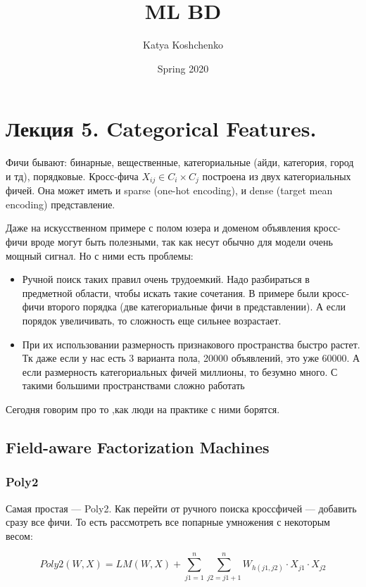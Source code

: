\documentclass[12pt]{article}
\title{ML BD}
\date{Spring 2020}
\begin{document}
\author{Katya Koshchenko}
\maketitle

\section{Лекция 5. Categorical Features.}  

Фичи бывают: бинарные, вещественные, категориальные (айди, категория, город и тд), порядковые. Кросс-фича $X_{ij} \in C_i \times C_j$ построена из двух категориальных фичей. Она может иметь и sparse (one-hot encoding), и dense (target mean encoding) представление. 

Даже на искусственном примере с полом юзера и доменом объявления кросс-фичи вроде могут быть полезными, так как несут обычно для модели очень мощный сигнал. Но с ними есть проблемы:
\begin{itemize}
    \item  Ручной поиск таких правил очень трудоемкий. Надо разбираться в предметной области, чтобы искать такие сочетания. В примере были кросс-фичи второго порядка (две категориальные фичи в представлении). А если порядок увеличивать, то сложность еще сильнее возрастает.
    
    \item При их использовании размерность признакового пространства быстро растет. Тк даже если у нас есть 3 варианта пола, 20000 объявлений, это уже 60000. А если размерность категориальных фичей миллионы, то безумно много. С такими большими пространствами сложно работать
\end{itemize}

Сегодня говорим про то ,как люди на практике с ними борятся.

\subsection{Field-aware Factorization Machines} 

\subsubsection{Poly2} 

Самая простая --- Poly2. Как перейти от ручного поиска кроссфичей --- добавить сразу все фичи. То есть рассмотреть все попарные умножения с некоторым весом:

$$ Poly2(W, X) = LM(W, X) + \sum_{j1=1}^{n} {\sum_{j2=j1+1}^{n} W_{h(j1, j2)}\cdot X_{j1} \cdot X_{j2}} $$
\end{document}
